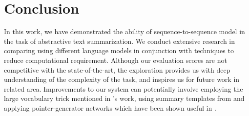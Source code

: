 \section{Conclusion}
\label{sec: conclusion}

In this work, we have demonstrated the ability of sequence-to-sequence model in the task of abstractive text summarization. We conduct extensive research in comparing using different language models in conjunction with techniques to reduce computational requirement. Although our evaluation scores are not competitive with the state-of-the-art, the exploration provides us with deep understanding of the complexity of the task, and inspires us for future work in related area. Improvements to our system can potentially involve employing the large vocabulary trick mentioned in \cite{jean2014using}'s work, using summary templates from \cite{cao2018retrieve} and applying pointer-generator networks which have been shown useful in \cite{see2017get}. 